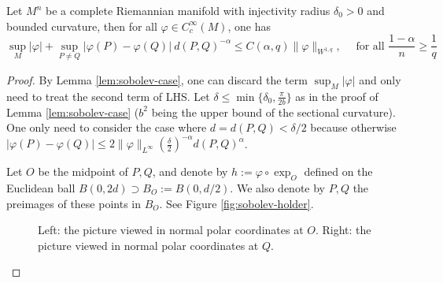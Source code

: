\documentclass[11pt]{article}
\begin{document}
\begin{lemma}
\label{lem:sobolev-case-holder}
Let \(M^n\) be a complete Riemannian manifold with injectivity radius \(\delta_0>0\)
and bounded curvature, then for all \(\varphi\in C_c^\infty(M)\), one
has
\[
\sup_M |\varphi| + \sup_{P\ne Q} |\varphi(P) -\varphi(Q)|\ d(P,Q)^{-\alpha} \leq
C(\alpha,q) \|\varphi\|_{W^{1,q}},\quad \text{ for all } \frac{1-\alpha}{n}\geq \frac{1}{q}
\]
\end{lemma}
\begin{proof}
By Lemma \ref{lem:sobolev-case}, one can discard the term \(\sup_M |\varphi|\) and only
need to treat the second term of LHS. Let \(\delta \leq \min\{\delta_0, \frac{\pi}{2b}\}\) as in the proof of Lemma \ref{lem:sobolev-case} (\(b^2\) being the upper bound of the
sectional curvature). One only need to consider the case where \(d=d(P,Q) <\delta/2\)
because otherwise \(|\varphi(P)-\varphi(Q)| \leq 2\|\varphi \|_{L^\infty}(\frac{\delta}{2})^{-\alpha}d(P,Q)^\alpha\).

Let \(O\) be the midpoint of \(P,Q\), and denote by \(h:=\varphi\circ\exp_O\)
defined on the Euclidean ball \(B(0,2d)\supset B_O:=B(0,d/2)\). We also denote by \(P,Q\) the
preimages of these points in \(B_O\). See Figure \ref{fig:sobolev-holder}.

\label{fig:sobolev-holder}
\begin{figure}[htbp]
\centering
\caption{Left: the picture viewed in normal polar coordinates at \(O\). Right: the picture viewed in normal polar coordinates at \(Q\).}
\end{figure}


\end{proof}
\end{document}
